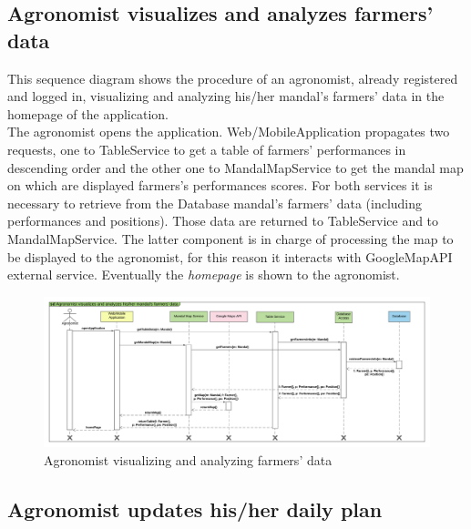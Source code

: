 \subsection{Agronomist visualizes and analyzes farmers' data}

This sequence diagram shows the procedure of an agronomist, already registered and logged in, visualizing and analyzing his/her mandal's farmers' data in the homepage of the application.\\
The agronomist opens the application. 
Web/MobileApplication propagates two requests, one to TableService to get a table of farmers' performances in descending order and the other one to MandalMapService to get the mandal map on which are displayed farmers's performances scores. For both services it is necessary to retrieve from the Database mandal's farmers' data (including performances and positions). Those data are returned to TableService and to MandalMapService. The latter component is in charge of processing the map to be displayed to the agronomist, for this reason it interacts with GoogleMapAPI external service.
Eventually the \textit{homepage} is shown to the agronomist.

\newpage
\begin{landscape}
\begin{figure}[t!]
\vspace*{1.5cm}
\noindent
\centering
\centerline{\includegraphics[scale= 0.108]{./Images/Sequence diagram/Agronomist visualizes and analyzes his_her mandal's farmers' data.png}}
    \caption{Agronomist visualizing and analyzing farmers' data}
    \vspace*{-12cm}
\end{figure}
\fillandplacepagenumber
\end{landscape}

\subsection{Agronomist updates his/her daily plan}

